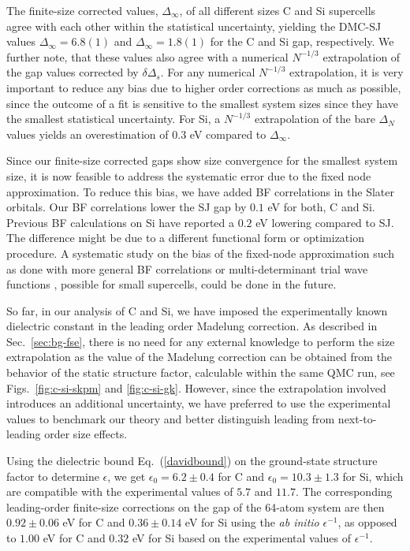 The finite-size corrected values, $\Delta_\infty$, of all different sizes C and Si supercells agree with
each other within the statistical uncertainty, yielding the DMC-SJ values $\Delta_\infty=6.8(1)$
and  $\Delta_\infty=1.8(1)$ for the C and Si gap, respectively. 
We further note, that these values also agree with a numerical
$N^{-1/3}$ extrapolation of the gap values corrected by $\delta \Delta_s$. For any numerical
$N^{-1/3}$ extrapolation, it is very important to reduce any bias due to higher order corrections
as much as possible, since the outcome of a fit is sensitive to the smallest system sizes
since they have the smallest statistical uncertainty. For Si,
a $N^{-1/3}$ extrapolation
of the bare $\Delta_N$ values yields an overestimation of $0.3$ eV compared to $\Delta_\infty$.

Since our finite-size corrected gaps show size convergence for the smallest system size,
it is now feasible to address the systematic error due to the fixed node approximation.
To reduce this bias,
we have added BF correlations in the Slater orbitals. Our BF correlations lower
the SJ gap by $0.1$ eV for both, C and Si.
Previous BF calculations \cite{Hunt} on Si have reported a $0.2$ eV lowering compared to SJ.
The difference might be due to a different functional form or optimization procedure.
A systematic study on the bias of the fixed-node approximation such as done with more general BF correlations \cite{BFN,orbitalbf} or
multi-determinant trial wave functions \cite{Zhao19}, possible for small supercells,
could be done in the future.

So far, in our analysis of C and Si, we have imposed the experimentally known dielectric constant
in the leading order Madelung correction. As described in Sec.~\ref{sec:bg-fse},
there is no need for any external knowledge to perform the size extrapolation as the value
of the Madelung correction can be obtained from the behavior of the static structure factor,
calculable within the same QMC run, see  Figs.~\ref{fig:c-si-skpm} and \ref{fig:c-si-gk}. However, since
 the extrapolation involved introduces an additional uncertainty, we have preferred to use
the experimental values to benchmark our theory and better distinguish leading
from next-to-leading order size effects. 

Using the dielectric bound Eq.~(\ref{davidbound}) on the ground-state structure factor to determine $\epsilon$, we get $\epsilon_0=6.2\pm0.4$ for C and $\epsilon_0=10.3\pm1.3$ for Si, which are compatible with the experimental values of $5.7$ and $11.7$. The corresponding leading-order finite-size corrections on the gap of the 64-atom system are then $0.92\pm0.06$ eV for C and $0.36\pm0.14$ eV for Si using the \emph{ab initio} $\epsilon^{-1}$, as opposed to $1.00$ eV for C and $0.32$ eV for Si based on the experimental values of $\epsilon^{-1}$.

